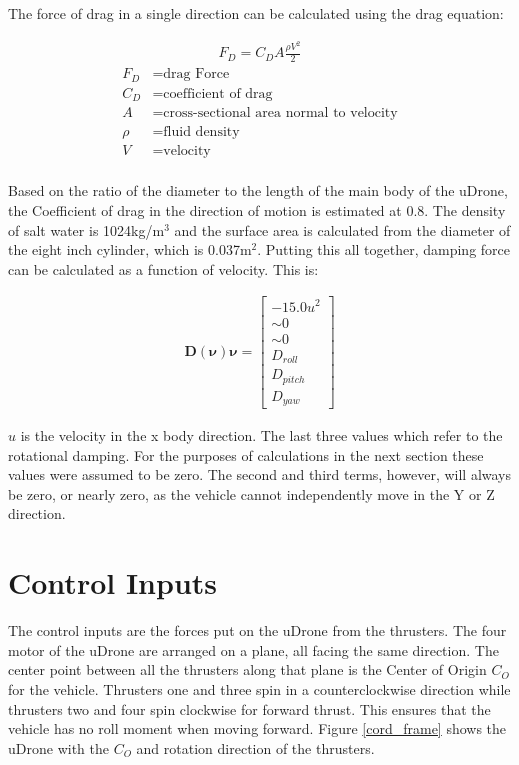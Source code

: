 The force of drag in a single direction can be calculated using the drag equation:

\begin{gather}
F_{D}=C_{D} A \frac{\rho V^{2}}{2}
\end{gather}
\begin{align*}
    F_D&=\text{drag Force}\\
    C_D&=\text{coefficient of drag}\\
    A&=\text{cross-sectional area normal to velocity}\\
    \rho&=\text{fluid density}\\
    V&=\text{velocity}\\
\end{align*}

Based on the ratio of the diameter to the length of the main body of the uDrone, the Coefficient of drag in the direction of motion is estimated at 0.8. The density of salt water is 1024kg/m$^3$ and the surface area is calculated from the diameter of the eight inch cylinder, which is 0.037m$^2$. Putting this all together, damping force can be calculated as a function of velocity. This is:

\begin{gather}
    \boldsymbol{D}(\boldsymbol{\nu})\boldsymbol{\nu}=\left[\begin{array}{c}
        -15.0u ^2 \\ \sim 0 \\ \sim 0 \\ D_{roll} \\ D_{pitch} \\ D_{yaw}
     \end{array}\right]
\end{gather}

$u$ is the velocity in the x body direction. The last three values which refer to the rotational damping. For the purposes of calculations in the next section these values were assumed to be zero. The second and third terms, however, will always be zero, or nearly zero, as the vehicle cannot independently move in the Y or Z direction.

\section{Control Inputs}\label{control_inputs}

The control inputs are the forces put on the uDrone from the thrusters. The four motor of the uDrone are arranged on a plane, all facing the same direction. The center point between all the thrusters along that plane is the Center of Origin $C_O$ for the vehicle. Thrusters one and three spin in a counterclockwise direction while thrusters two and four spin clockwise for forward thrust. This ensures that the vehicle has no roll moment when moving forward. Figure \ref{cord_frame} shows the uDrone with the $C_O$ and rotation direction of the thrusters. 


